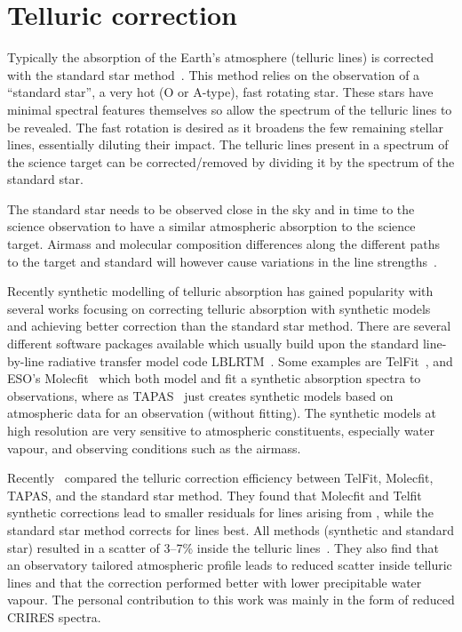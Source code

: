 
\section{Telluric correction}
\label{sec:telluric_correction}

Typically the absorption of the Earth's atmosphere (telluric lines) is corrected with the standard star method~\citep[e.g.][]{vacca_method_2003}.
This method relies on the observation of a ``standard star'', a very hot (O or A-type), fast rotating star.
These stars have minimal spectral features themselves so allow the spectrum of the telluric lines to be revealed.
The fast rotation is desired as it broadens the few remaining stellar lines, essentially diluting their impact.
The telluric lines present in a spectrum of the science target can be corrected/removed by dividing it by the spectrum of the standard star.

The standard star needs to be observed close in the sky and in time to the science observation to have a similar atmospheric absorption to the science target.
Airmass and molecular composition differences along the different paths to the target and standard will however cause variations in the line strengths~\citep{bailey_correcting_2007}.

Recently synthetic modelling of telluric absorption has gained popularity with several works focusing on correcting telluric absorption with synthetic models~\citep[e.g.][]{bailey_correcting_2007, cotton_atmospheric_2014, seifahrt_synthesising_2010} and achieving better correction than the standard star method.
There are several different software packages available which usually build upon the standard line-by-line radiative transfer model code {LBLRTM}~\citep{clough_linebyline_1995}.
Some examples are {TelFit}~\citep{gullikson_correcting_2014}, and ESO's {Molecfit}~\citep{smette_molecfit_2015} which both model and fit a synthetic absorption spectra to observations, where as {TAPAS}~\citep{bertaux_tapas_2014} just creates synthetic models based on atmospheric data for an observation (without fitting).
The synthetic models at high resolution are very sensitive to atmospheric constituents, especially water vapour, and observing conditions such as the airmass.

Recently~\citet{ulmer-moll_telluric_2018} compared the telluric correction efficiency between {TelFit}, {Molecfit}, {TAPAS}, and the standard star method.
They found that {Molecfit} and {Telfit} synthetic corrections lead to smaller residuals for lines arising from , while the standard star method corrects for  lines best.
All methods (synthetic and standard star) resulted in a scatter of 3--7\% inside the telluric lines~\citep{ulmer-moll_telluric_2018}.
They also find that an observatory tailored atmospheric profile leads to reduced scatter inside telluric lines and that the correction performed better with lower precipitable water vapour.
The personal contribution to this work was mainly in the form of reduced CRIRES spectra.

